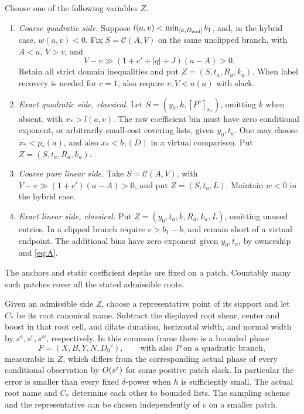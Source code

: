 \begin{definition}\label{names:side}
Choose one of the following variables \(Z\).
\begin{enumerate}[label=(\roman*)]
\item \emph{Coarse quadratic side.} Suppose
\(l(a,v)<\min_{[a,D_{\rm end}]}b_1\), and, in the hybrid case,
\(w(a,v)<0\). Fix \(S=\mathcal C(A,V)\) on the same unclipped
branch, with \(A<a\), \(V>v\), and
\[
 V-v\gg(1+c'+|q|+J)(a-A)>0.
\]
Retain all strict domain inequalities and put
\(Z=(S,t_a,R_a,k_a)\). When label recovery is needed for
\(c=1\), also require \(v,V<u(a)\) with slack.
\item \emph{Exact quadratic side, classical.} Let
\(S=(y_0,\bar k,[P^\diamond]_{x_*})\), omitting \(\bar k\)
when absent, with \(x_*>l(a,v)\). The raw coefficient bin must
have zero conditional exponent, or arbitrarily small-cost covering
lists, given \(y_0,t_a\). One may choose
\(x_*<p_*(a)\), and also \(x_*<b_1(D)\) in a virtual
comparison. Put \(Z=(S,t_a,R_a,k_a)\).
\item \emph{Coarse pure linear side.} Take
\(S=\mathcal C(A,V)\), with
\(V-v\gg(1+c')(a-A)>0\), and put \(Z=(S,t_a,L)\).
Maintain \(w<0\) in the hybrid case.
\item \emph{Exact linear side, classical.} Put
\(Z=(y_0,t_a,\bar k,R_a,k_a,L)\), omitting unused entries.
In a clipped branch require \(v>b_1-b\), and remain short of a
virtual endpoint. The additional bins have zero exponent given
\(y_0,t_a\), by ownership and \eqref{eq:A}.
\end{enumerate}
The anchors and static coefficient depths are fixed on a patch.
Countably many such patches cover all the stated admissible roots.
\end{definition}

\begin{lemma}\label{names:common-phase}
Given an admissible side \(Z\), choose a representative point of its
support and let \(C_*\) be its root canonical name. Subtract the
displayed root shear, center and boost in that root cell, and dilate
duration, horizontal width, and normal width by
\(s^a,s^v,s^w\), respectively. In this common frame there is a
bounded phase
\[
 F=(X,B,Y,N,D_0'),\qquad\text{with also }P\text{ on a quadratic branch},
\]
measurable in \(Z\), which differs from the corresponding actual
phase of every conditional observation by \(O(s^\varepsilon)\) for
some positive patch slack. In particular the error is smaller than
every fixed \(\delta\)-power when \(h\) is sufficiently small.
The actual root name and \(C_*\) determine each other to bounded
lists. The sampling scheme and the representative can be chosen
independently of \(v\) on a smaller patch.
\end{lemma}

